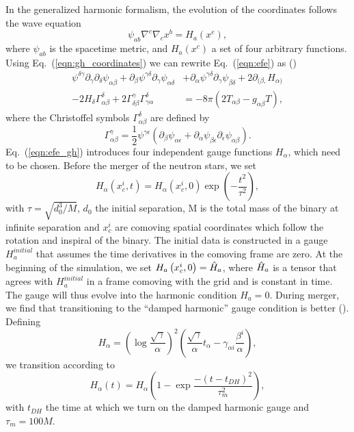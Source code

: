 In the generalized harmonic formalism, the evolution of the coordinates follows the wave equation
%
\begin{equation}
  \label{eqn:gh_coordinates}
  \psi_{ab}\nabla^c\nabla_cx^b = H_a\left(x^e\right),
\end{equation}
%
where $\psi_{ab}$ is the spacetime metric, and $H_a(x^c)$ a set of four arbitrary functions. Using Eq.~(\ref{eqn:gh_coordinates}) we can rewrite 
Eq.~(\ref{eqn:efe}) as (\cite{pretorius2005numerical})
%
\begin{equation}
  \begin{split}
  \label{eqn:efe_gh}
  \psi^{\delta\gamma}\partial_\gamma\partial_\delta\psi_{\alpha\beta} + \partial_\beta\psi^{\gamma\delta}\partial_\gamma\psi_{\alpha\delta} &+ \partial_\alpha\psi^{\gamma\delta}\partial_\gamma\psi_{\beta\delta} + 2\partial_{(\beta,} H_{\alpha)} \\
  - 2H_\delta\Gamma^\delta_{\alpha\beta} + 2\Gamma^\gamma_{\delta\beta}\Gamma^{\delta}_{\gamma\alpha} &= -8\pi(2T_{\alpha\beta} - g_{\alpha\beta}T),
  \end{split}
\end{equation}
%
where the Christoffel symbols $\Gamma^\delta_{\alpha\beta}$ are defined by
%
\begin{equation}
\Gamma^\gamma_{\alpha\beta} = \frac{1}{2}\psi^{\gamma\epsilon}\left(\partial_\beta\psi_{\alpha\epsilon} + \partial_\alpha\psi_{\beta\epsilon} \partial_\epsilon\psi_{\alpha\beta}\right).
\end{equation}
%
Eq.~(\ref{eqn:efe_gh}) introduces four independent gauge functions $H_\alpha$, which need to be chosen. Before the merger of the neutron stars, we set
%
\begin{equation}
H_\alpha\left(x^i_c,t\right) = H_\alpha\left(x^i_c,0\right)\exp\left(-\frac{t^2}{\tau^2}\right),
\end{equation}
%
with $\tau = \sqrt{d^3_0/M}$, $d_0$ the initial separation, M is the total mass of the binary at infinite separation and $x^i_c$ are comoving spatial coordinates which follow the rotation and inspiral of the binary. The initial data is constructed in a gauge $H^{initial}_a$ that assumes the time derivatives in the comoving frame are zero. At the beginning of the simulation, we set $H_a\left(x^i_c,0\right) = \Hat H_a$, where $\Hat H_a$ is a tensor that agrees with $H^{initial}_a$ in a frame comoving with the grid and is constant in time. The gauge will thus evolve into the harmonic condition $H_a = 0$. During merger, we find that transitioning to the ``damped harmonic'' gauge condition is better (\cite{szilagyi2014key}). Defining
%
\begin{equation}
  H_\alpha = \left(\log{\frac{\sqrt{\gamma}}{\alpha}}\right)^2\left(\frac{\sqrt{\gamma}}{\alpha}t_\alpha - \gamma_{\alpha i} \frac{\beta^i}{\alpha}\right),
\end{equation}
%
we transition according to
%
\begin{equation}
  H_\alpha(t) = H_\alpha\left(1-\exp{\frac{-(t-t_{DH})^2}{\tau_{m}^2}}\right),
\end{equation}
%
with $t_{DH}$ the time at which we turn on the damped harmonic gauge and $\tau_m = 100M$.


